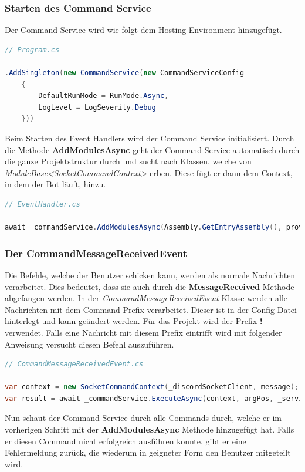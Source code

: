 \documentclass[a4paper, table]{article}
\begin{document}
\subsubsection*{Starten des Command Service}
Der Command Service wird wie folgt dem Hosting Environment hinzugefügt.

\begin{lstlisting}[language=csharp]
// Program.cs

.AddSingleton(new CommandService(new CommandServiceConfig
    {
        DefaultRunMode = RunMode.Async,
        LogLevel = LogSeverity.Debug
    }))
\end{lstlisting}

Beim Starten des Event Handlers wird der Command Service initialisiert.
Durch die Methode \textbf{AddModulesAsync} geht der Command Service automatisch durch die ganze Projektstruktur durch und 
sucht nach Klassen, welche von \textit{ModuleBase<SocketCommandContext>} erben. 
Diese fügt er dann dem Context, in dem der Bot läuft, hinzu.

\begin{lstlisting}[language=csharp]
// EventHandler.cs

await _commandService.AddModulesAsync(Assembly.GetEntryAssembly(), provider);
\end{lstlisting}

\subsubsection*{Der CommandMessageReceivedEvent}
Die Befehle, welche der Benutzer schicken kann, werden als normale Nachrichten verarbeitet.
Dies bedeutet, dass sie auch durch die \textbf{MessageReceived} Methode abgefangen werden.
In der \textit{CommandMessageReceivedEvent}-Klasse werden alle Nachrichten mit dem Command-Prefix verarbeitet.
Dieser ist in der Config Datei hinterlegt und kann geändert werden.
Für das Projekt wird der Prefix \textbf{!} verwendet.
Falls eine Nachricht mit diesem Prefix eintrifft wird mit folgender Anweisung versucht diesen Befehl auszuführen.

\begin{lstlisting}[language=csharp]
// CommandMessageReceivedEvent.cs

var context = new SocketCommandContext(_discordSocketClient, message);
var result = await _commandService.ExecuteAsync(context, argPos, _serviceProvider);
\end{lstlisting}

Nun schaut der Command Service durch alle Commands durch, 
welche er im vorherigen Schritt mit der \textbf{AddModulesAsync} Methode hinzugefügt hat.
Falls er diesen Command nicht erfolgreich ausführen konnte, gibt er eine Fehlermeldung zurück, 
die wiederum in geigneter Form den Benutzer mitgeteilt wird.
\end{document}
